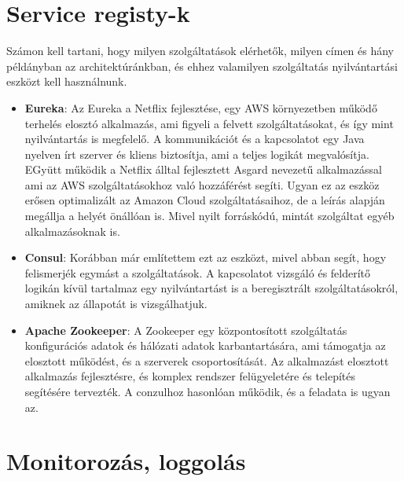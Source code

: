 \documentclass[11pt,magyar,a4paper,oneside,]{report}
\begin{document}
\section{Service registy-k \citep{service-registry-pattern}
\citep{micro-introPt3}}\label{service-registy-k-service-registry-pattern-micro-intropt3}

Számon kell tartani, hogy milyen szolgáltatások elérhetők, milyen címen
és hány példányban az architektúránkban, és ehhez valamilyen
szolgáltatás nyilvántartási eszközt kell használnunk.

\begin{itemize}
\item
  \textbf{Eureka}\citep{eureka-glance}: Az Eureka a Netflix fejlesztése,
  egy AWS környezetben működő terhelés elosztó alkalmazás, ami figyeli a
  felvett szolgáltatásokat, és így mint nyilvántartás is megfelelő. A
  kommunikációt és a kapcsolatot egy Java nyelven írt szerver és kliens
  biztosítja, ami a teljes logikát megvalósítja. EGyütt működik a
  Netflix álltal fejlesztett Asgard nevezetű alkalmazással ami az AWS
  szolgáltatásokhoz való hozzáférést segíti. Ugyan ez az eszköz erősen
  optimalizált az Amazon Cloud szolgáltatásaihoz, de a leírás alapján
  megállja a helyét önállóan is. Mivel nyilt forráskódú, mintát
  szolgáltat egyéb alkalmazásoknak is.
\item
  \textbf{Consul}: Korábban már említettem ezt az eszközt, mivel abban
  segít, hogy felismerjék egymást a szolgáltatások. A kapcsolatot
  vizsgáló és felderítő logikán kívül tartalmaz egy nyilvántartást is a
  beregisztrált szolgáltatásokról, amiknek az állapotát is
  vizsgálhatjuk.
\item
  \textbf{Apache Zookeeper}\citep{zookeeper}: A Zookeeper egy
  központosított szolgáltatás konfigurációs adatok és hálózati adatok
  karbantartására, ami támogatja az elosztott működést, és a szerverek
  csoportosítását. Az alkalmazást elosztott alkalmazás fejlesztésre, és
  komplex rendszer felügyeletére és telepítés segítésére tervezték. A
  conzulhoz hasonlóan működik, és a feladata is ugyan az.
\end{itemize}

\section{Monitorozás, loggolás \citep{micro-service-monitoring}
\citep{microservice-monitoring}}\label{monitorozuxe1s-loggoluxe1s-micro-service-monitoring-microservice-monitoring}
\end{document}
